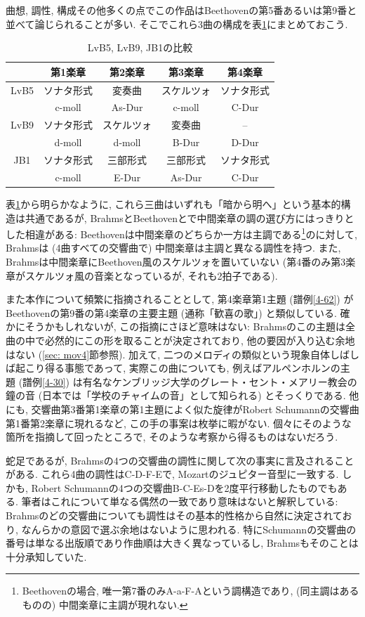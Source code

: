 曲想, 調性, 構成その他多くの点でこの作品はBeethovenの第5番あるいは第9番と並べて論じられることが多い.
そこでこれら3曲の構成を表\ref{comparison}にまとめておこう.

\begin{table}[htbp]
	\centering
	\begin{tabular}{c|cccc}
		& 第1楽章 & 第2楽章 & 第3楽章 & 第4楽章 \\ \hline
		LvB5 & ソナタ形式 & 変奏曲 & スケルツォ & ソナタ形式 \\
		& c-moll & As-Dur & c-moll & C-Dur \\ \hline
		LvB9 & ソナタ形式 & スケルツォ & 変奏曲 & -- \\
		& d-moll & d-moll & B-Dur & D-Dur \\ \hline
		JB1 & ソナタ形式 & 三部形式 & 三部形式 & ソナタ形式 \\
		& c-moll & E-Dur & As-Dur & C-Dur
	\end{tabular}
	\caption{LvB5, LvB9, JB1の比較}
	\label{comparison}
\end{table}

表\ref{comparison}から明らかなように, これら三曲はいずれも「暗から明へ」という基本的構造は共通であるが,
BrahmsとBeethovenとで中間楽章の調の選び方にはっきりとした相違がある:
Beethovenは中間楽章のどちらか一方は主調である\footnote{Beethovenの場合,
唯一第7番のみA-a-F-Aという調構造であり, (同主調はあるものの) 中間楽章に主調が現れない.}のに対して, Brahmsは (4曲すべての交響曲で) 中間楽章は主調と異なる調性を持つ.
また, Brahmsは中間楽章にBeethoven風のスケルツォを置いていない (第4番のみ第3楽章がスケルツォ風の音楽となっているが, それも2拍子である).

また本作について頻繁に指摘されることとして, 第4楽章第1主題 (譜例\ref{4-62}) がBeethovenの第9番の第4楽章の主要主題 (通称「歓喜の歌」) と類似している.
確かにそうかもしれないが, この指摘にさほど意味はない:
Brahmsのこの主題は全曲の中で必然的にこの形を取ることが決定されており, 他の要因が入り込む余地はない (\ref{sec: mov4}節参照).
加えて, 二つのメロディの類似という現象自体しばしば起こり得る事態であって,
実際この曲についても, 例えばアルペンホルンの主題 (譜例\ref{4-30}) は有名なケンブリッジ大学のグレート・セント・メアリー教会の鐘の音
(日本では「学校のチャイムの音」として知られる) とそっくりである.
他にも, 交響曲第3番第1楽章の第1主題によく似た旋律がRobert Schumannの交響曲第1番第2楽章に現れるなど, この手の事案は枚挙に暇がない.
個々にそのような箇所を指摘して回ったところで, そのような考察から得るものはないだろう.

蛇足であるが, Brahmsの4つの交響曲の調性に関して次の事実に言及されることがある.
これら4曲の調性はC-D-F-Eで, Mozartのジュピター音型に一致する. しかも, Robert Schumannの4つの交響曲B-C-Es-Dを2度平行移動したものでもある.
筆者はこれについて単なる偶然の一致であり意味はないと解釈している:
Brahmsのどの交響曲についても調性はその基本的性格から自然に決定されており, なんらかの意図で選ぶ余地はないように思われる.
特にSchumannの交響曲の番号は単なる出版順であり作曲順は大きく異なっているし, Brahmsもそのことは十分承知していた.
